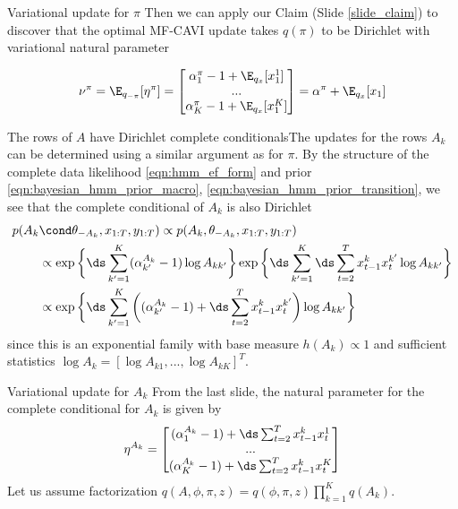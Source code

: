 \documentclass[10pt]{beamer}
\begin{document}
{\begin{frame}{Variational update for $\pi$}
Then 
we can apply our Claim (Slide \ref{slide_claim}) to discover that the optimal MF-CAVI update takes $q(\pi)$ to be Dirichlet with variational natural parameter 

\[  \nu^{\pi} = \E_{q_{-\pi}} [\eta^{\pi}]=
 \begin{bmatrix} 
\alpha_1^\pi  -1 +  \E_{q_x} [x_1^1 ] \\
... \\
\alpha_K^\pi  -1 +   \E_{q_x} [x_1^K] \\
 \end{bmatrix}
 = \alpha^\pi + \E_{q_x} [x_1]  \]
\end{frame}

\begin{frame}{The rows of $A$ have Dirichlet complete conditionals}The updates for the rows $A_k$ can be determined using a similar argument as for $\pi$.   By the structure of the complete data likelihood \eqref{eqn:hmm_ef_form} and prior \eqref{eqn:bayesian_hmm_prior_macro}, \eqref{eqn:bayesian_hmm_prior_transition}, we see that the complete conditional of $A_k$ is also Dirichlet 
\begin{align*}
p(A_k & \cond \theta_{-A_k}, x_{1:T}, y_{1:T} ) \propto p(A_k, \theta_{-A_k},  x_{1:T}, y_{1:T}) \\
&\propto \exp \bigg\{ \ds\sum_{k'=1}^K  (\alpha_{k'}^{A_k} -1) \log A_{kk'} \bigg\}  \exp \bigg\{  \ds\sum_{k'=1}^K \ds\sum_{t=2}^T  x_{t-1}^k x_t^{k'} \log A_{kk'}  \bigg\}  \\
&\propto \exp \bigg\{ \ds\sum_{k'=1}^K  \bigg( (\alpha_{k'}^{A_k} -1) + \ds\sum_{t=2}^T  x_{t-1}^k x_t^{k'}  \bigg) \log A_{kk'}   \bigg\}  
\end{align*}
since this is an exponential family with base measure  $h(A_k) \propto 1$ and sufficient statistics  $\log A_k  = [\log A_{k1}, ..., \log A_{kK}]^T$. 

\end{frame}


\begin{frame}{Variational update for $A_k$}
From the last slide, the natural parameter for the complete conditional for $A_k$ is given by 
\small
\[ \eta^{A_k} =
 \begin{bmatrix} 
(\alpha_1^{A_k} -1) + \ds\sum_{t=2}^T x_{t-1}^k x_t^{1} \\
... \\
(\alpha_K^{A_k} -1) + \ds\sum_{t=2}^T x_{t-1}^k x_t^{K} \\
 \end{bmatrix}
 \]
\normalsize
Let us assume factorization $q(A,\phi,\pi, z) = q(\phi, \pi, z) \prod_{k=1}^K q(A_k)$.
 

\end{frame}}
\end{document}
